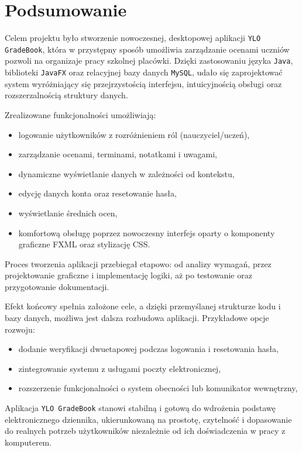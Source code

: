 \chapter{Podsumowanie}
\label{cha:podsumowanie}

Celem projektu było stworzenie nowoczesnej, desktopowej aplikacji \texttt{YLO GradeBook}, która w przystępny sposób umożliwia zarządzanie ocenami uczniów pozwoli na organizaje pracy szkolnej placówki. Dzięki zastosowaniu języka \texttt{Java}, biblioteki \texttt{JavaFX} oraz relacyjnej bazy danych \texttt{MySQL}, udało się zaprojektować system wyróżniający się przejrzystością interfejsu, intuicyjnością obsługi oraz rozszerzalnością struktury danych.

Zrealizowane funkcjonalności umożliwiają:
\begin{itemize}
    \item logowanie użytkowników z rozróżnieniem ról (nauczyciel/uczeń),
    \item zarządzanie ocenami, terminami, notatkami i uwagami,
    \item dynamiczne wyświetlanie danych w zależności od kontekstu,
    \item edycję danych konta oraz resetowanie hasła,
    \item wyświetlanie średnich ocen,
    \item komfortową obsługę poprzez nowoczesny interfejs oparty o komponenty graficzne FXML oraz stylizację CSS.
\end{itemize}

Proces tworzenia aplikacji przebiegał etapowo: od analizy wymagań, przez projektowanie graficzne i implementację logiki, aż po testowanie oraz przygotowanie dokumentacji. 

Efekt końcowy spełnia założone cele, a dzięki przemyślanej strukturze kodu i bazy danych, możliwa jest dalsza rozbudowa aplikacji. Przykładowe opcje rozwoju:
\begin{itemize}
    \item dodanie weryfikacji dwuetapowej podczas logowania i resetowania hasła,
    \item zintegrowanie systemu z usługami poczty elektronicznej,
    \item rozszerzenie funkcjonalności o system obecności lub komunikator wewnętrzny,
\end{itemize}

Aplikacja \texttt{YLO GradeBook} stanowi stabilną i gotową do wdrożenia podstawę elektronicznego dziennika, ukierunkowaną na prostotę, czytelność i dopasowanie do realnych potrzeb użytkowników niezależnie od ich doświadczenia w pracy z komputerem.

